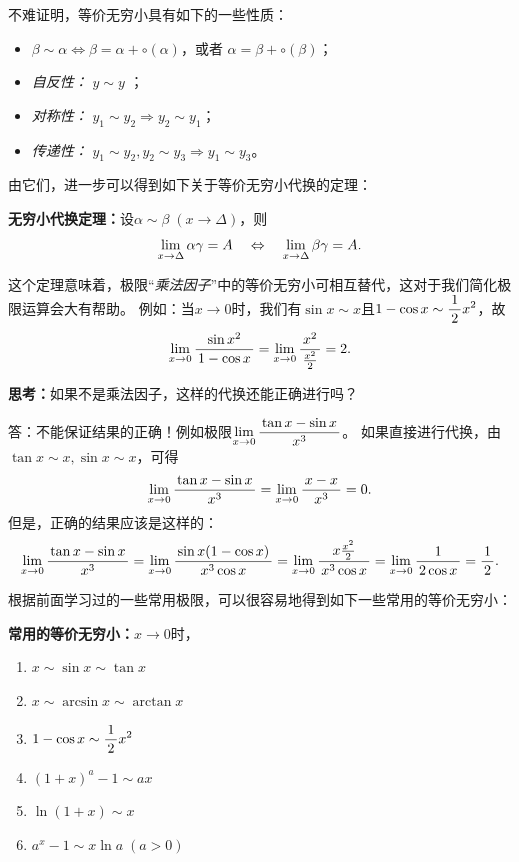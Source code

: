 
不难证明，等价无穷小具有如下的一些性质：
\begin{itemize}
  \setlength{\itemindent}{1cm}
  \item $\beta\sim\alpha\Leftrightarrow\beta=\alpha+\circ(\alpha)$，或者
	$\alpha=\beta+\circ(\beta)$；
  \item {\it 自反性：} $y\sim y$ ；
  \item {\it 对称性：} $y_1\sim y_2\Rightarrow y_2\sim y_1$； 
  \item {\it 传递性：} $y_1\sim y_2,y_2\sim y_3\Rightarrow y_1\sim y_3$。 
\end{itemize}

由它们，进一步可以得到如下关于等价无穷小代换的定理：

\begin{thx}
	{\bf 无穷小代换定理：}设$\alpha\sim \beta\;(x\to\Delta)$，则
	$$\lim\limits_{x\to{\Delta}}\alpha\gamma=A
	\quad\Leftrightarrow\quad\lim\limits_{x\to{\Delta}}\beta\gamma=A.$$
\end{thx}

这个定理意味着，极限“{\it 乘法因子}”中的等价无穷小可相互替代，这对于我们简化极限运算会大有帮助。
例如：当$x\to 0$时，我们有$\sin x\sim x$且$1-\cos x\sim\displaystyle\frac{\,{1}\,}{\,{2}\,}x^2$，故
$$\lim\limits_{x\to{0}}\displaystyle\frac{\,{\sin x^2}\,}{\,{1-\cos x}\,}=\lim\limits_{x\to{0}}\displaystyle\frac{\,{x^2}\,}{\,{\frac{x^2}2}\,}=2.$$

\bs
{\bf 思考：}如果不是乘法因子，这样的代换还能正确进行吗？

\ifhint
答：不能保证结果的正确！例如极限$\lim\limits_{x\to{0}}\displaystyle\frac{\,{\tan x-\sin x}\,}{\,{x^3}\,}$。
如果直接进行代换，由$\tan x\sim x,\sin x\sim x$，可得
$$\lim\limits_{x\to{0}}\displaystyle\frac{\,{\tan x-\sin x}\,}{\,{x^3}\,}=\lim\limits_{x\to{0}}\displaystyle\frac{\,{x-x}\,}{\,{x^3}\,}=0.$$
但是，正确的结果应该是这样的：
$$
	\lim\limits_{x\to{0}}\displaystyle\frac{\,{\tan x-\sin x}\,}{\,{x^3}\,}
	=\lim\limits_{x\to{0}}\displaystyle\frac{\,{\sin x(1-\cos x)}\,}{\,{x^3\cos x}\,}
	=\lim\limits_{x\to{0}}\displaystyle\frac{\,{x\frac{x^2}2}\,}{\,{x^3\cos x}\,}
	=\lim\limits_{x\to{0}}\displaystyle\frac{\,{1}\,}{\,{2\cos x}\,}=\displaystyle\frac{\,{1}\,}{\,{2}\,}.
$$
\fi

\bs
根据前面学习过的一些常用极限，可以很容易地得到如下一些常用的等价无穷小：
\begin{thx}
	{\bf 常用的等价无穷小：}$x\to 0$时，
	\begin{enumerate}[(1)]
	  \item $x\sim \sin x\sim \tan x$ 
	  \item $x \sim\arcsin x\sim\arctan x$ 
	  \item $1-\cos x\sim \displaystyle\frac{\,{1}\,}{\,{2}\,} x^2$ 
	  \item $(1+x)^a-1\sim ax$ 
	  \item $\ln(1+x)\sim x$ 
	  \item $a^x-1\sim x\ln a\;(a>0)$
	\end{enumerate}
\end{thx}

